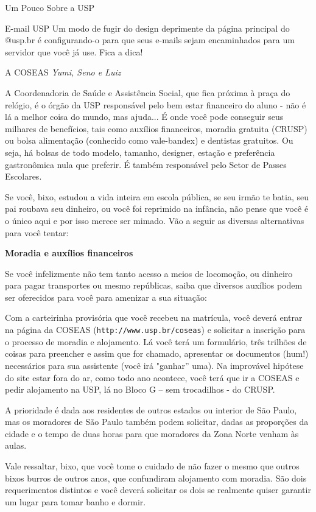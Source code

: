 \begin{secao}{Um Pouco Sobre a USP}
\begin{subsecao}{E-mail USP}
Um modo de fugir do design deprimente da página principal do @usp.br é
configurando-o para que seus e-mails sejam encaminhados para um servidor que
você já use. Fica a dica! 

\end{subsecao}

\begin{subsecao}{A COSEAS}
{\em Yumi, Seno e Luiz}

A Coordenadoria de Saúde e Assistência Social, que fica próxima à praça do relógio,
é o órgão da USP responsável pelo bem estar financeiro do aluno - não é lá a
melhor coisa do mundo, mas ajuda... É onde você pode conseguir seus milhares de
benefícios, tais como auxílios financeiros, moradia gratuita (CRUSP) ou bolsa
alimentação (conhecido como vale-bandex) e dentistas gratuitos. Ou seja, há
bolsas de todo modelo, tamanho, designer, estação e preferência gastronômica
nula que preferir. É também responsável pelo Setor de Passes Escolares. 

Se você, bixo, estudou a vida inteira em escola pública, se seu irmão te batia,
seu pai roubava seu dinheiro, ou você foi reprimido na infância, não pense que
você é o único aqui e por isso merece ser mimado. Vão a seguir as diversas
alternativas para você tentar:

{\bf Moradia e auxílios financeiros}

Se você infelizmente não tem tanto acesso a meios de locomoção, ou dinheiro para
pagar transportes ou mesmo repúblicas, saiba que diversos auxílios podem ser
oferecidos para você para amenizar a sua situação:

Com a carteirinha provisória que você recebeu na matrícula, você deverá entrar
na página da COSEAS ({\tt http://www.usp.br/coseas}) e solicitar a inscrição
para o processo de moradia e alojamento. Lá você terá um formulário, três
trilhões de coisas para preencher e assim que for chamado, apresentar os
documentos (hum!) necessários para sua assistente (você irá "ganhar” uma). Na
improvável hipótese do site estar fora do ar, como todo ano acontece, você terá
que ir a COSEAS e pedir alojamento na USP, lá no Bloco G – sem trocadilhos - do
CRUSP.

A prioridade é dada aos residentes de outros estados ou interior de São Paulo,
mas os moradores de São Paulo também podem solicitar, dadas as proporções da
cidade e o tempo de duas horas para que moradores da Zona Norte venham às aulas. 

Vale ressaltar, bixo, que você tome o cuidado de não fazer o mesmo que outros
bixos burros de outros anos, que confundiram alojamento com moradia. São dois
requerimentos distintos e você deverá solicitar os dois se realmente quiser
garantir um lugar para tomar banho e dormir.


\end{subsecao}
\end{secao}
